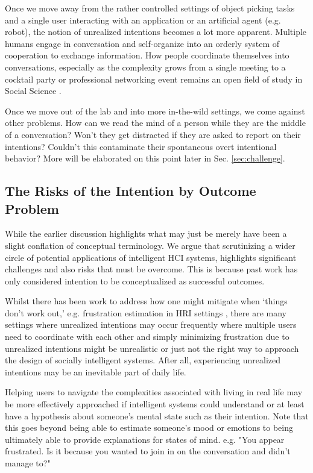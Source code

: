 \documentclass[sigconf]{acmart}
\begin{document}
Once we move away from the rather controlled settings of object picking tasks and a single user interacting with an application or an artificial agent (e.g. robot), the notion of unrealized intentions becomes a lot more apparent. Multiple humans engage in conversation and self-organize into an orderly system of cooperation to exchange information. How people coordinate themselves into conversations, especially as the complexity grows from a single meeting to a cocktail party or professional networking event remains an open field of study in Social Science \cite{KendonInteraction1990,dioszegietal2020b}. 

Once we move out of the lab and into more in-the-wild settings, we come against other problems. How can we read the mind of a person while they are the middle of a conversation? Won't they get distracted if they are asked to report on their intentions? Couldn't this contaminate their spontaneous overt intentional behavior? More will be elaborated on this point later in Sec. \ref{sec:challenge}.

\subsection{The Risks of the Intention by Outcome Problem}
While the earlier discussion highlights what may just be merely have been a slight conflation of conceptual terminology. We argue that scrutinizing a wider circle of potential applications of intelligent HCI systems, highlights significant challenges and also risks that must be overcome. This is because past work has only considered intention to be conceptualized as successful outcomes. 

Whilst there has been work to address how one might mitigate when `things don't work out,' e.g. frustration estimation in HRI settings \cite{10.3389/fpsyg.2021.640186}, there are many settings where unrealized intentions may occur frequently where multiple users need to coordinate with each other and simply minimizing frustration due to unrealized intentions might be unrealistic or just not the right way to approach the design of socially intelligent systems. After all, experiencing unrealized intentions may be an inevitable part of daily life. 

Helping users to navigate the complexities associated with living in real life may be more effectively approached if intelligent systems could understand or at least have a hypothesis about someone's mental state such as their intention. Note that this goes beyond being able to estimate someone's mood or emotions to being ultimately able to provide explanations for states of mind. e.g. "You appear frustrated. Is it because you wanted to join in on the conversation and didn't manage to?"
\end{document}
